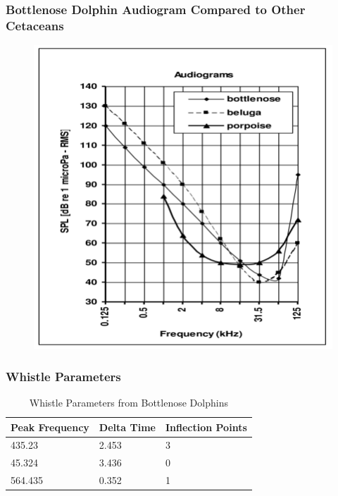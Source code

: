 \documentclass[12pt]{beamer}\usepackage[]{graphicx}\usepackage[]{color}
\begin{document}
\begin{frame}
\frametitle{Bottlenose Dolphin Audiogram Compared to Other Cetaceans}
 \begin{figure}
   \includegraphics[width=1.0\linewidth]{Examples-of-absolute-audiograms-for-the-bottlenose-dolphin-beluga-whale-and-harbour.png}
\end{figure}
\end{frame}

\begin{frame}
\frametitle{Whistle Parameters}
\begin{table}
\begin{tabular}{l l l}
\toprule
\textbf{Peak Frequency} & \textbf{Delta Time} & \textbf{Inflection Points}\\
\midrule
435.23 & 2.453 & 3 \\
45.324 & 3.436 & 0 \\
564.435 & 0.352 & 1 \\
\bottomrule
\end{tabular}
\caption{Whistle Parameters from Bottlenose Dolphins}
\end{table}
\end{frame}
\end{document}
